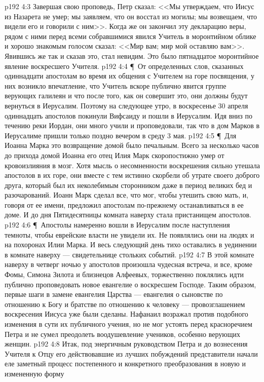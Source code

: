 \vs p192 4:3 Завершая свою проповедь, Петр сказал: <<Мы утверждаем, что Иисус из Назарета не умер; мы заявляем, что он восстал из могилы; мы возвещаем, что видели его и говорили с ним>>. Когда же он закончил эту декларацию веры, рядом с ними перед всеми собравшимися явился Учитель в моронтийном облике и хорошо знакомым голосом сказал: <<Мир вам; мир мой оставляю вам>>. Явившись же так и сказав это, стал невидим. Это было пятнадцатое моронтийное явление воскресшего Учителя.
\vs p192 4:4 \P\ От определенных слов, сказанных одиннадцати апостолам во время их общения с Учителем на горе посвящения, у них возникло впечатление, что Учитель вскоре публично явится группе верующих галилеян и что после того, как он совершит это, они должны будут вернуться в Иерусалим. Поэтому на следующее утро, в воскресенье 30 апреля одиннадцать апостолов покинули Вифсаиду и пошли в Иерусалим. Идя вниз по течению реки Иордан, они много учили и проповедовали, так что в дом Марков в Иерусалиме пришли только поздно вечером в среду 3 мая.
\vs p192 4:5 \P\ Для Иоанна Марка это возвращение домой было печальным. Всего за несколько часов до прихода домой Иоанна его отец Илия Марк скоропостижно умер от кровоизлияния в мозг. Хотя мысль о несомненности воскрешения сильно утешала апостолов в их горе, они вместе с тем истинно скорбели об утрате своего доброго друга, который был их неколебимым сторонником даже в период великих бед и разочарований. Иоанн Марк сделал все, что мог, чтобы утешить свою мать, и, говоря от ее имени, предложил апостолам по\hyp{}прежнему останавливаться в ее доме. И до дня Пятидесятницы комната наверху стала пристанищем апостолов.
\vs p192 4:6 \P\ Апостолы намеренно вошли в Иерусалим после наступления темноты, чтобы еврейские власти не увидели их. Не появлялись они на людях и на похоронах Илии Марка. И весь следующий день тихо оставались в уединении в комнате наверху --- свидетельнице стольких событий.
\vs p192 4:7 В этой комнате наверху в четверг ночью у апостолов произошла чудесная встреча, и все, кроме Фомы, Симона Зилота и близнецов Алфеевых, торжественно поклялись идти публично проповедовать новое евангелие о воскресшем Господе. Таким образом, первые шаги в замене евангелия Царства --- евангелия о сыновстве по отношению к Богу и братстве по отношению к человеку --- провозглашением воскресения Иисуса уже были сделаны. Нафанаил возражал против подобного изменения в сути их публичного учения, но не мог устоять перед красноречием Петра и не сумел преодолеть воодушевление учеников, особенно верующих женщин.
\vs p192 4:8 Итак, под энергичным руководством Петра и до вознесения Учителя к Отцу его действовавшие из лучших побуждений представители начали еле заметный процесс постепенного и конкретного преобразования  в новую и измененную форму 
